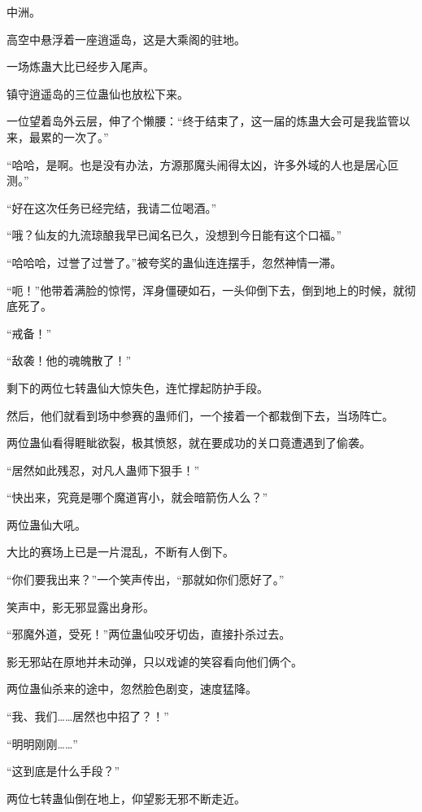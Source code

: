 
\begin{this_body}

中洲。

高空中悬浮着一座逍遥岛，这是大乘阁的驻地。

一场炼蛊大比已经步入尾声。

镇守逍遥岛的三位蛊仙也放松下来。

一位望着岛外云层，伸了个懒腰：“终于结束了，这一届的炼蛊大会可是我监管以来，最累的一次了。”

“哈哈，是啊。也是没有办法，方源那魔头闹得太凶，许多外域的人也是居心叵测。”

“好在这次任务已经完结，我请二位喝酒。”

“哦？仙友的九流琼酿我早已闻名已久，没想到今日能有这个口福。”

“哈哈哈，过誉了过誉了。”被夸奖的蛊仙连连摆手，忽然神情一滞。

“呃！”他带着满脸的惊愕，浑身僵硬如石，一头仰倒下去，倒到地上的时候，就彻底死了。

“戒备！”

“敌袭！他的魂魄散了！”

剩下的两位七转蛊仙大惊失色，连忙撑起防护手段。

然后，他们就看到场中参赛的蛊师们，一个接着一个都栽倒下去，当场阵亡。

两位蛊仙看得睚眦欲裂，极其愤怒，就在要成功的关口竟遭遇到了偷袭。

“居然如此残忍，对凡人蛊师下狠手！”

“快出来，究竟是哪个魔道宵小，就会暗箭伤人么？”

两位蛊仙大吼。

大比的赛场上已是一片混乱，不断有人倒下。

“你们要我出来？”一个笑声传出，“那就如你们愿好了。”

笑声中，影无邪显露出身形。

“邪魔外道，受死！”两位蛊仙咬牙切齿，直接扑杀过去。

影无邪站在原地并未动弹，只以戏谑的笑容看向他们俩个。

两位蛊仙杀来的途中，忽然脸色剧变，速度猛降。

“我、我们……居然也中招了？！”

“明明刚刚……”

“这到底是什么手段？”

两位七转蛊仙倒在地上，仰望影无邪不断走近。


\end{this_body}

